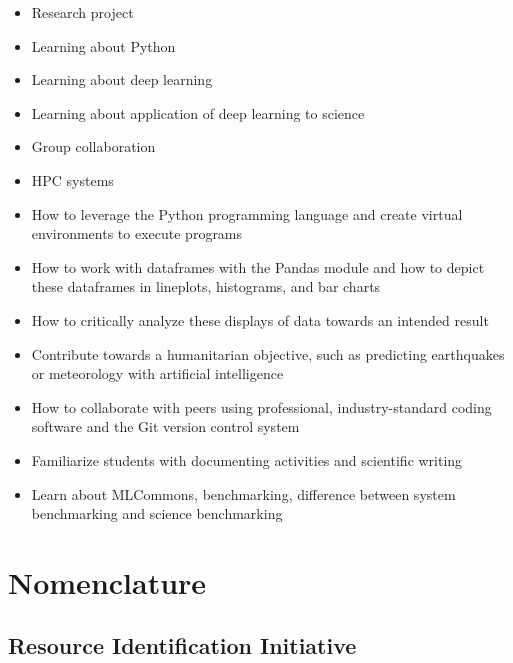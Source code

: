 \documentclass[utf8]{FrontiersinVancouver} %
\begin{document}
\begin{itemize}

    \item Research project

    \item Learning about Python

    \item Learning about deep learning

    \item Learning about application of deep learning to science

    \item Group collaboration

    \item HPC systems

    \item How to leverage the Python programming language and create virtual environments to execute programs

    \item How to work with dataframes with the Pandas module and how to depict these dataframes in lineplots, histograms, and bar charts

    \item How to critically analyze these displays of data towards an intended result

    \item Contribute towards a humanitarian objective, such as predicting earthquakes or meteorology with artificial intelligence

    \item How to collaborate with peers using professional, industry-standard coding software and the Git version control system

    \item Familiarize students with documenting activities and scientific writing

    \item Learn about MLCommons, benchmarking, difference between system benchmarking and science benchmarking

\end{itemize}


\section{Nomenclature}

\subsection{Resource Identification Initiative}
\end{document}
